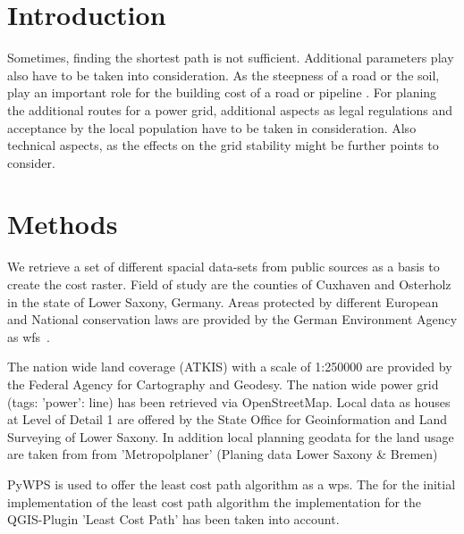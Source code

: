 \documentclass[acmtog]{acmart}
\begin{document}
	\section{Introduction}
	
	Sometimes, finding the shortest path is not sufficient.
	Additional parameters play also have to be taken into consideration.
	As the steepness of a road or the soil, play an important role for the building cost of a road or pipeline
	.
	For planing the additional routes for a power grid, additional aspects as legal regulations and acceptance
	by the local population have to be taken in consideration.
	Also technical aspects, as the effects on the grid stability might be further points to consider.\cite{schafer_understanding_2022}


	\section{Methods}
	We retrieve a set of different spacial data-sets from  public sources as a basis to create the cost raster.
	Field of study are the counties of Cuxhaven and Osterholz in the state of Lower Saxony, Germany.
	Areas protected by different European and National conservation laws are provided by the German Environment Agency
	as \acrfull{wfs}~\cite{noauthor_schutzgebiete_2015}.

	The nation wide land coverage (ATKIS) with a scale of 1:250000 are provided by the Federal Agency for Cartography
	and Geodesy\cite{noauthor_digitales_2021}.
	The nation wide power grid (tags: 'power': line) has been retrieved via OpenStreetMap.\cite{boeing_osmnx_2017}
	Local data as houses at Level of Detail 1 are offered by the State Office for Geoinformation and Land Surveying of
	Lower Saxony\cite{noauthor_opengeodatani_2022}.
	In addition local planning geodata for the land usage are taken from
	from 'Metropolplaner' (Planing data Lower Saxony \& Bremen)\cite{noauthor_metropolplaner_2022}
	
	PyWPS\cite{noauthor_welcome_2016} is used to offer the least cost path algorithm as a \acrfull{wps}.
	The for the initial implementation of the least cost path algorithm the implementation for the QGIS-Plugin
	'Least Cost Path'\cite{noauthor_leastcostpathdijkstra_algorithmpy_2022} has been taken into account.
	
\end{document}
